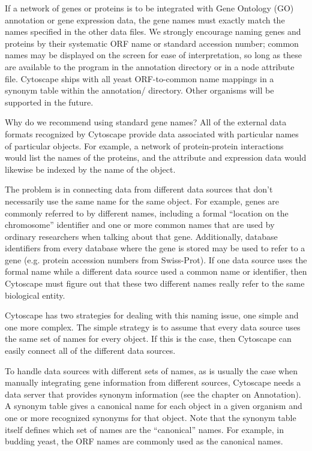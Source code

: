  If a network of genes or proteins is to be integrated with Gene Ontology (GO) annotation or gene expression data, the gene names must exactly match the names specified in the other data files. We strongly encourage naming genes and proteins by their systematic ORF name or standard accession number; common names may be displayed on the screen for ease of interpretation, so long as these are available to the program in the annotation directory or in a node attribute file. Cytoscape ships with all yeast ORF-to-common name mappings in a synonym table within the annotation/ directory. Other organisms will be supported in the future. 

 Why do we recommend using standard gene names? All of the external data formats recognized by Cytoscape provide data associated with particular names of particular objects. For example, a network of protein-protein interactions would list the names of the proteins, and the attribute and expression data would likewise be indexed by the name of the object. 

 The problem is in connecting data from different data sources that don't necessarily use the same name for the same object. For example, genes are commonly referred to by different names, including a formal ``location on the chromosome'' identifier and one or more common names that are used by ordinary researchers when talking about that gene. Additionally, database identifiers from every database where the gene is stored may be used to refer to a gene (e.g. protein accession numbers from Swiss-Prot). If one data source uses the formal name while a different data source used a common name or identifier, then Cytoscape must figure out that these two different names really refer to the same biological entity. 

 Cytoscape has two strategies for dealing with this naming issue, one simple and one more complex. The simple strategy is to assume that every data source uses the same set of names for every object. If this is the case, then Cytoscape can easily connect all of the different data sources. 


 To handle data sources with different sets of names, as is usually the case when manually integrating gene information from different sources, Cytoscape needs a data server that provides synonym information (see the chapter on Annotation). A synonym table gives a canonical name for each object in a given organism and one or more recognized synonyms for that object. Note that the synonym table itself defines which set of names are the ``canonical'' names. For example, in budding yeast, the ORF names are commonly used as the canonical names. 


